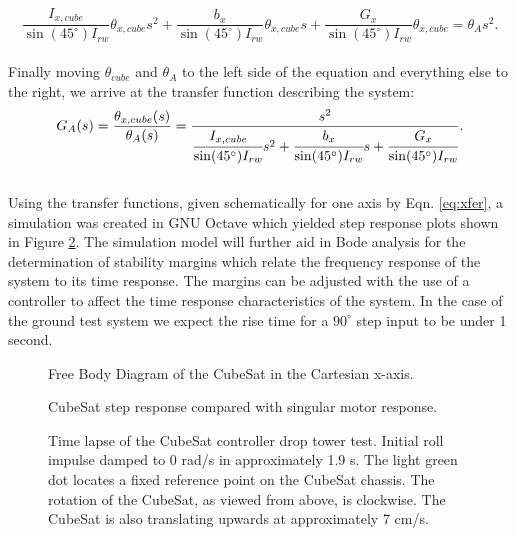 \documentclass[]{aiaa-tc}%
\begin{document}
\[
\frac{I_{x,cube}}{\sin(45^{\circ}) I_{rw}} \theta_{x,cube} s^2 +
\frac{b_x}{\sin(45^{\circ}) I_{rw}} \theta_{x,cube} s +
\frac{G_x}{\sin(45^{\circ}) I_{rw}} \theta_{x,cube} = \theta_A s^2.
\]\\
	
Finally moving $\theta_{cube}$ and $\theta_A$ to the left side of the equation and everything else to the right, we arrive at the transfer function describing the system:\\

\begin{equation}
\label{eq:xfer}
G_A(s)=\frac{\theta_{x,cube}(s)}{\theta_A(s)}=\frac{s^2}{\cfrac{I_{x,cube}}{\sin(45^{\circ}) I_{rw}}s^2 + \cfrac{b_x}{\sin(45^{\circ}) I_{rw}}s + \cfrac{G_x}{\sin(45^{\circ}) I_{rw}}}.
\end{equation}\\
	
Using the transfer functions, given schematically for one axis by Eqn. \ref{eq:xfer}, a simulation was created in GNU Octave which yielded step response plots shown in Figure \ref{fig:simulation}. The simulation model will further aid in Bode analysis for the determination of stability margins which relate the frequency response of the system to its time response. The margins can be adjusted with the use of a controller to affect the time response characteristics of the system. In the case of the ground test system we expect the rise time for a $90^{\circ}$ step input to be under 1 second. 
\begin{figure}[h!]
  \centering
  
  \caption{Free Body Diagram of the CubeSat in the Cartesian x-axis.}
  \label{fig:FBD}
\end{figure}

\begin{figure}[h!]
  \centering
  {\footnotesize }
  \caption{CubeSat step response compared with singular motor response.}
  \label{fig:simulation}
\end{figure}

\begin{figure}[!ht]
 \centering
 {}
 \caption{Time lapse of the CubeSat controller drop tower test. Initial roll impulse damped to 0 rad/s in approximately 1.9 s. The light green dot locates a fixed reference point on the CubeSat chassis. The rotation of the CubeSat, as viewed from above, is clockwise. The CubeSat is also translating upwards at approximately 7 cm/s.}
 \label{fig:lapse}
\end{figure}
\end{document}
